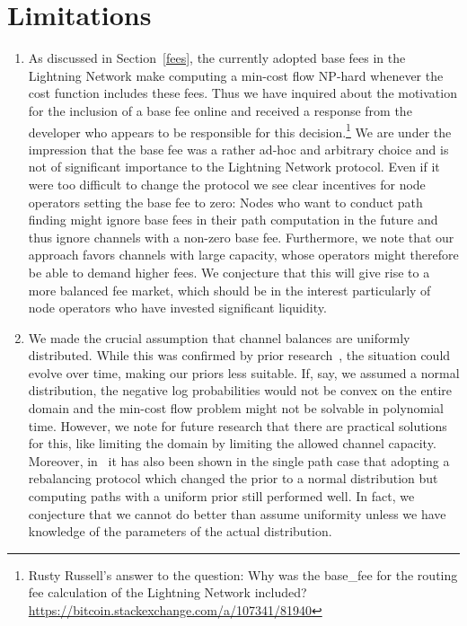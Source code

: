 \documentclass[10pt,twocolumn]{article}
\begin{document}
\section{Limitations}

\begin{enumerate}
\item As discussed in Section~\ref{fees}, the currently adopted base fees in the Lightning Network make computing a min-cost flow NP-hard whenever the cost function includes these fees. Thus we have inquired about the motivation for the inclusion of a base fee online and received a response from the developer who appears to be responsible for this decision.\footnote{Rusty Russell's answer to the question: Why was the base\_fee for the routing fee calculation of the Lightning Network included? \url{https://bitcoin.stackexchange.com/a/107341/81940}}
We are under the impression that the base fee was a rather ad-hoc and arbitrary choice and is not of significant importance to the Lightning Network protocol.
Even if it were too difficult to change the protocol we see clear incentives for node operators setting the base fee to zero:
Nodes who want to conduct path finding might ignore base fees in their path computation in the future and thus ignore channels with a non-zero base fee.
Furthermore, we note that our approach favors channels with large capacity, whose operators might therefore be able to demand higher fees.
We conjecture that this will give rise to a more balanced fee market, which should be in the interest particularly of node operators who have invested significant liquidity.
\item We made the crucial assumption that channel balances are uniformly distributed. While this was confirmed by prior research~\cite{pickhardt2021security}, the situation could evolve over time, making our priors less suitable.
If, say, we assumed a normal distribution, the negative log probabilities would not be convex on the entire domain and the min-cost flow problem might not be solvable in polynomial time.
However, we note for future research that there are practical solutions
for this, like limiting the domain by limiting the allowed channel capacity. Moreover, in~\cite{pickhardt2021security} it has also been shown in the single path case that adopting a rebalancing protocol which changed the prior to a normal distribution but computing paths with a uniform prior still performed well.
In fact, we conjecture that we cannot do better than assume uniformity unless we have knowledge of the parameters of the actual distribution.

\end{enumerate}
\end{document}

